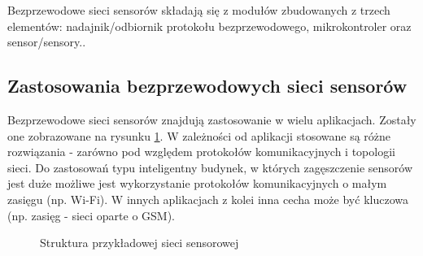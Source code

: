 \documentclass[12pt, twoside, hidelinks, a4paper]{article}
\begin{document}
Bezprzewodowe sieci sensorów składają się z modułów zbudowanych z trzech elementów: nadajnik/odbiornik protokołu bezprzewodowego, mikrokontroler oraz sensor/sensory.\cite{c4}. 

\subsection{Zastosowania bezprzewodowych sieci sensorów}
Bezprzewodowe sieci sensorów znajdują zastosowanie w wielu aplikacjach. Zostały one zobrazowane na rysunku \ref{fig:example_struct}. W zależności od aplikacji stosowane są różne rozwiązania - zarówno pod względem protokołów komunikacyjnych i topologii sieci. Do zastosowań typu inteligentny budynek, w których zagęszczenie sensorów jest duże możliwe jest wykorzystanie protokołów komunikacyjnych o małym zasięgu (np. Wi-Fi)\cite{c3}. W innych aplikacjach z kolei inna cecha może być kluczowa (np. zasięg - sieci oparte o GSM)\cite{c10}.

\begin{center}
\begin{figure}[H]

\caption{Struktura przykładowej sieci sensorowej\cite{c4}}
\label{fig:example_struct}
\end{figure}
\end{center}
\end{document}
